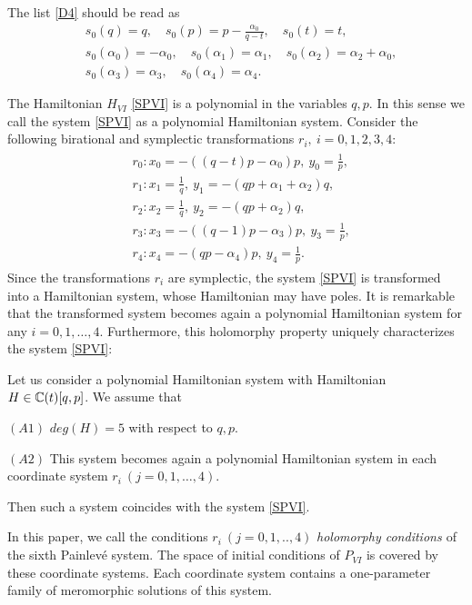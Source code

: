 The list \eqref{D4} should be read as
\begin{align*}
&s_0(q)=q, \quad s_0(p)=p-\frac{\alpha_0}{q-t}, \quad s_0(t)=t,\\
&s_0(\alpha_0)=-\alpha_0, \quad s_0(\alpha_1)=\alpha_1, \quad s_0(\alpha_2)=\alpha_2+\alpha_0,\\
&s_0(\alpha_3)=\alpha_3, \quad s_0(\alpha_4)=\alpha_4.
\end{align*}



The Hamiltonian $H_{VI}$ \eqref{SPVI} is a polynomial in the variables $q,p$. In this sense we call the system \eqref{SPVI} as a polynomial Hamiltonian system. Consider the following birational and symplectic transformations $r_i, \ i=0,1,2,3,4$:
\begin{align}\label{holoPVI}
\begin{split}
&r_0:x_0=-((q-t)p-\alpha_0)p,\ y_0=\frac{1}{p},\\
&r_1:x_1=\frac{1}{q}, \ y_1=-(qp+\alpha_1+\alpha_2)q, \\
&r_2:x_2=\frac{1}{q}, \ y_2=-(qp+\alpha_2)q,\\
&r_3:x_3=-((q-1)p-\alpha_3)p,\ y_3=\frac{1}{p},\\
&r_4:x_4=-(qp-\alpha_4)p,\ y_4=\frac{1}{p}.
\end{split}
\end{align}
Since the transformations $r_i$ are symplectic, the system \eqref{SPVI} is transformed into a Hamiltonian system, whose Hamiltonian may have poles. It is remarkable that the transformed system becomes again a polynomial Hamiltonian system for any $i=0,1,\dots,4$. Furthermore, this holomorphy property uniquely characterizes the system \eqref{SPVI}:

\begin{prop}
Let us consider a polynomial Hamiltonian system with Hamiltonian $H \in {\Bbb C}(t)[q,p]$. We assume that

$(A1)$ $deg(H)=5$ with respect to $q,p$.

$(A2)$ This system becomes again a polynomial Hamiltonian system in each coordinate system $r_i \ (j=0,1,\dots,4)$.

\noindent
Then such a system coincides with the system \eqref{SPVI}.
\end{prop}
In this paper, we call the conditions $r_i \ (j=0,1,..,4)$ {\it holomorphy conditions \it} of the sixth Painlev\'e system. The space of initial conditions of $P_{VI}$ is covered by these coordinate systems. Each coordinate system contains a one-parameter family of meromorphic solutions of this system.

